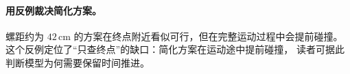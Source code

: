 \paragraph{用反例裁决简化方案。}
螺距约为 $42\,\mathrm{cm}$ 的方案在终点附近看似可行，但在完整运动过程中会提前碰撞。
这个反例定位了“只查终点”的缺口：简化方案在运动途中提前碰撞，
读者可据此判断模型为何需要保留时间推进。

